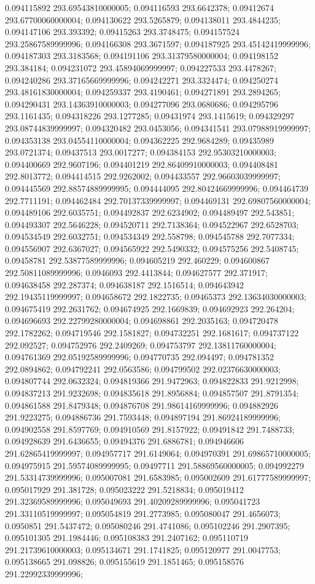 0.094115892 293.69543810000005; 0.094116593 293.6642378; 0.09412674 293.67700060000004; 0.094130622 293.5265879; 0.094138011 293.4844235; 0.094147106 293.393392; 0.09415263 293.3748475; 0.094157524 293.25867589999996; 0.094166308 293.3671597; 0.094187925 293.45142419999996; 0.094187303 293.3183568; 0.094191106 293.31379580000004; 0.094198152 293.384184; 0.094231072 293.45894069999997; 0.094227533 293.4478267; 0.094240286 293.37165669999996; 0.094242271 293.3324474; 0.094250274 293.48161830000004; 0.094259337 293.4190461; 0.094271891 293.2894265; 0.094290431 293.14363910000003; 0.094277096 293.0680686; 0.094295796 293.1161435; 0.094318226 293.1277285; 0.09431974 293.1415619; 0.094329297 293.08744839999997; 0.094320482 293.0453056; 0.094341541 293.07988919999997; 0.094353138 293.04554110000004; 0.094362225 292.9684289; 0.09435989 293.0721374; 0.09437513 293.0017277; 0.094384153 292.95303210000003; 0.094400669 292.9607196; 0.094401219 292.86409910000003; 0.094408481 292.8013772; 0.094414515 292.9262002; 0.094433557 292.96603039999997; 0.094445569 292.88574889999995; 0.094444095 292.80424669999996; 0.094464739 292.7711191; 0.094462484 292.70137339999997; 0.094469131 292.69807560000004; 0.094489106 292.6035751; 0.094492837 292.6234902; 0.094489497 292.543851; 0.094493307 292.5646228; 0.094520711 292.7138364; 0.094522967 292.6528703; 0.094534549 292.6032751; 0.094534349 292.558798; 0.094545788 292.7077334; 0.094556907 292.6367027; 0.094565922 292.5490332; 0.094575256 292.5408745; 0.09458781 292.53877589999996; 0.094605219 292.460229; 0.094600867 292.50811089999996; 0.0946093 292.4413844; 0.094627577 292.371917; 0.094638458 292.287374; 0.094638187 292.1516514; 0.094643942 292.19435119999997; 0.094658672 292.1822735; 0.09465373 292.13634030000003; 0.094675419 292.2631762; 0.094674925 292.1669839; 0.094692923 292.264204; 0.094696693 292.22799280000004; 0.094698861 292.2035163; 0.094720478 292.1782262; 0.094719546 292.1581827; 0.094732251 292.1681617; 0.094737122 292.092527; 0.094752976 292.2409269; 0.094753797 292.13811760000004; 0.094761369 292.05192589999996; 0.094770735 292.094497; 0.094781352 292.0894862; 0.094792241 292.0563586; 0.094799502 292.02376630000003; 0.094807744 292.0632324; 0.094819366 291.9472963; 0.094822833 291.9212998; 0.094837213 291.9232698; 0.094835618 291.8956884; 0.094857507 291.8791354; 0.094861588 291.8479348; 0.094876708 291.98614169999996; 0.094882926 291.9223275; 0.094886736 291.7593448; 0.094897194 291.86924189999996; 0.094902558 291.8597769; 0.094910569 291.8157922; 0.09491842 291.7488733; 0.094928639 291.6436655; 0.09494376 291.6886781; 0.094946606 291.62865419999997; 0.094957717 291.6149064; 0.094970391 291.69865710000005; 0.094975915 291.59574089999995; 0.09497711 291.58869560000005; 0.094992279 291.53314739999996; 0.095007081 291.6583985; 0.095002609 291.61777589999997; 0.095017929 291.381728; 0.095023222 291.5218834; 0.095019412 291.32369589999996; 0.095049693 291.40209289999996; 0.095041723 291.33110519999997; 0.095054819 291.2773985; 0.095080047 291.4656073; 0.0950851 291.5437472; 0.095080246 291.4741086; 0.095102246 291.2907395; 0.095101305 291.1984446; 0.095108383 291.2407162; 0.095110719 291.21739610000003; 0.095134671 291.1741825; 0.095120977 291.0047753; 0.095138665 291.098826; 0.095155619 291.1851465; 0.095158576 291.22992339999996; 
